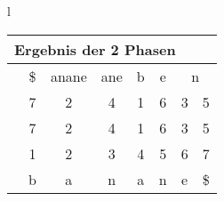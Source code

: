 \begin{table}[H]

\begin{center}
\begin{tabular}{l}

\begin{tabular}{lccccccc}
\multicolumn{8}{l}{Ergebnis der 2 Phasen}                                                                                                                                                                                                                                                                                                                        \\ \hline
\rowcolor[HTML]{\red} 
\multicolumn{1}{l|}{\cellcolor[HTML]{\red}Kontext} & \multicolumn{1}{c|}{\cellcolor[HTML]{\red}\$} & \multicolumn{1}{c|}{\cellcolor[HTML]{\red}anane} & \multicolumn{1}{c|}{\cellcolor[HTML]{\red}ane} & \multicolumn{1}{c|}{\cellcolor[HTML]{\red}b} & \multicolumn{1}{c|}{\cellcolor[HTML]{\red}e} & \multicolumn{2}{c}{\cellcolor[HTML]{\red}n} \\
\rowcolor[HTML]{\white} 
\multicolumn{1}{l|}{\cellcolor[HTML]{\white}Gruppe}  & \multicolumn{1}{c|}{\cellcolor[HTML]{\white}7}  & \multicolumn{1}{c|}{\cellcolor[HTML]{\white}2}     & \multicolumn{1}{c|}{\cellcolor[HTML]{\white}4}   & \multicolumn{1}{c|}{\cellcolor[HTML]{\white}1} & \multicolumn{1}{c|}{\cellcolor[HTML]{\white}6} & 3                     & 5                     \\
\rowcolor[HTML]{\gray} 
\multicolumn{1}{l|}{\cellcolor[HTML]{\gray}SA}      & \multicolumn{1}{c|}{\cellcolor[HTML]{\gray}7}  & \multicolumn{1}{c|}{\cellcolor[HTML]{\gray}2}     & \multicolumn{1}{c|}{\cellcolor[HTML]{\gray}4}   & \multicolumn{1}{c|}{\cellcolor[HTML]{\gray}1} & \multicolumn{1}{c|}{\cellcolor[HTML]{\gray}6} & 3                     & 5                     \\ \cline{2-8} 
\rowcolor[HTML]{\yellow} 
\multicolumn{1}{l|}{\cellcolor[HTML]{\yellow}Index}   & 1                                               & 2                                                  & 3                                                & 4                                              & 5                                              & 6                     & 7                     \\
\rowcolor[HTML]{\green} 
\multicolumn{1}{l|}{\cellcolor[HTML]{\green}Zeichen} & b                                               & a                                                  & n                                                & a                                              & n                                              & e                     & \$                   
\end{tabular}


\end{tabular}
\end{center}
\end{table}
